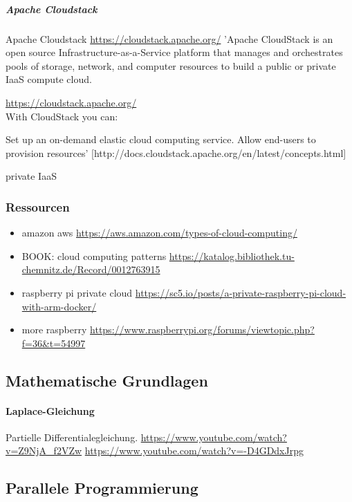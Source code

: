 \documentclass[a4paper,10pt]{article}
\begin{document}
\subparagraph{Apache Cloudstack}

\begin{boxed}{Apache Cloudstack \url{https://cloudstack.apache.org/}}
'Apache CloudStack is an open source Infrastructure-as-a-Service platform that manages and orchestrates pools of storage, network, and computer resources to build a public or private IaaS compute cloud.
\end{boxed}

\url{https://cloudstack.apache.org/}\\

With CloudStack you can:

Set up an on-demand elastic cloud computing service.
Allow end-users to provision resources' [http://docs.cloudstack.apache.org/en/latest/concepts.html]

private
IaaS

\subsubsection{Ressourcen}

\begin{itemize}
 \item amazon aws \url{https://aws.amazon.com/types-of-cloud-computing/}
 \item BOOK: cloud computing patterns \url{https://katalog.bibliothek.tu-chemnitz.de/Record/0012763915}
 \item raspberry pi private cloud \url{https://sc5.io/posts/a-private-raspberry-pi-cloud-with-arm-docker/}
 \item more raspberry \url{https://www.raspberrypi.org/forums/viewtopic.php?f=36&t=54997}
\end{itemize}

\subsection{Mathematische Grundlagen}

\paragraph{Laplace-Gleichung}
Partielle Differentialegleichung.
\url{https://www.youtube.com/watch?v=Z9NjA_f2VZw}
\url{https://www.youtube.com/watch?v=-D4GDdxJrpg}

\subsection{Parallele Programmierung}
\end{document}

